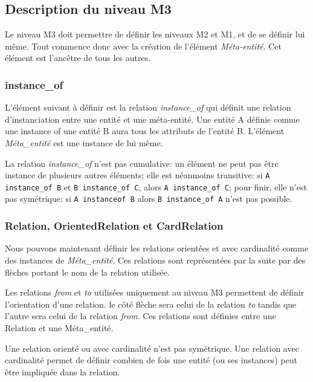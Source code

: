 \documentclass[french,a4paper,titlepage]{article}
\begin{document}
		\subsection{Description du niveau M3}
		
		
			Le niveau M3 doit permettre de définir les niveaux M2 et M1, et de se définir lui même. Tout commence donc avec la création de l'élément \emph{Méta-entité}. Cet élément est l'ancêtre de tous les autres.
			
			\subsubsection{instance\_of}
			
				L'élément suivant à définir est la relation \emph{instance\_of} qui définit une relation d'instanciation entre une entité et une méta-entité. Une entité A définie comme une instance of une entité B aura tous les attributs de l'entité B. L'élément \emph{Méta\_entité} est une instance de lui même.
				
				La relation \emph{instance\_of} n'est pas cumulative: un élément ne peut pas être instance de plusieurs autres éléments; elle est néanmoins transitive: si \verb!A instance_of B! et \verb!B instance_of C!, alors \verb!A instance_of C!; pour finir, elle n'est pas symétrique: si \verb!A instanceof B! alors \verb!B instance_of A! n'est pas possible.
				
			\subsubsection{Relation, OrientedRelation et CardRelation}
			
				Nous pouvons maintenant définir les relations orientées et avec cardinalité comme des instances de \emph{Méta\_entité}.
				Ces relations sont représentées par la suite par des flèches portant le nom de la relation utilisée.
				
				Les relations \emph{from} et \emph{to} utilisées uniquement au niveau M3 permettent de définir l'orientation d'une relation. le côté flèche sera celui de la relation \emph{to} tandis que l'autre sera celui de la relation \emph{from}. Ces relations sont définies entre une Relation et une Méta\_entité.
				
				Une relation orienté ou avec cardinalité n'est pas symétrique. Une relation avec cardinalité permet de définir combien de fois une entité (ou ses instances) peut être impliquée dans la relation.
				
\end{document}
